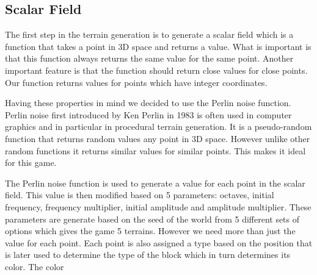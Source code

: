 \subsection*{Scalar Field} \label{subsec:scalar_field}
The first step in the terrain generation is to generate a scalar field which is a function that takes a point in 3D space and returns a value.
What is important is that this function always returns the same value for the same point.
Another important feature is that the function should return close values for close points.
Our function returns values for points which have integer coordinates.

Having these properties in mind we decided to use the Perlin noise function.
Perlin noise first introduced by Ken Perlin in 1983 \cite{perlin_noise} is often used in computer graphics and in particular in procedural terrain generation.
It is a pseudo-random function that returns random values any point in 3D space.
However unlike other random functions it returns similar values for similar points.
This makes it ideal for this game.

The Perlin noise function is used to generate a value for each point in the scalar field.
This value is then modified based on 5 parameters: octaves, initial frequency, frequency multiplier, initial amplitude and amplitude multiplier.
These parameters are generate based on the seed of the world from 5 different sets of options which gives the game 5 terrains.
However we need more than just the value for each point.
Each point is also assigned a type based on the position that is later used to determine the type of the block which in turn determines its color.
The color
